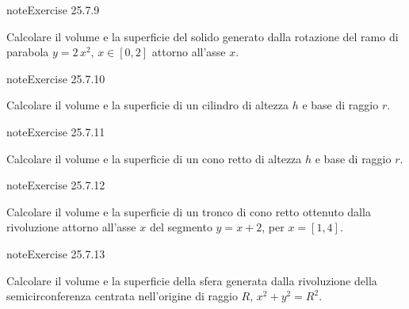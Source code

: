 \documentclass[letterpaper,10pt,italian]{jupyterBook}
\begin{document}
\begin{sphinxadmonition}{note}{Exercise 25.7.9}





\sphinxAtStartPar
Calcolare il volume e la superficie del solido generato dalla rotazione del ramo di parabola \(y = 2\, x^2\), \(x \in [0,2]\) attorno all’asse \(x\).
\end{sphinxadmonition}
 \label{exercise:ch/infinitesimal_calculus/integrals-problems-exercise-9}

\begin{sphinxadmonition}{note}{Exercise 25.7.10}





\sphinxAtStartPar
Calcolare il volume e la superficie di un cilindro di altezza \(h\) e base di raggio \(r\).
\end{sphinxadmonition}
 \label{exercise:ch/infinitesimal_calculus/integrals-problems-exercise-10}

\begin{sphinxadmonition}{note}{Exercise 25.7.11}





\sphinxAtStartPar
Calcolare il volume e la superficie di un cono retto di altezza \(h\) e base di raggio \(r\).
\end{sphinxadmonition}
 \label{exercise:ch/infinitesimal_calculus/integrals-problems-exercise-11}

\begin{sphinxadmonition}{note}{Exercise 25.7.12}





\sphinxAtStartPar
Calcolare il volume e la superficie di un tronco di cono retto ottenuto dalla rivoluzione attorno all’asse \(x\) del segmento \(y = x + 2\), per \(x = [1,4]\).
\end{sphinxadmonition}
 \label{exercise:ch/infinitesimal_calculus/integrals-problems-exercise-12}

\begin{sphinxadmonition}{note}{Exercise 25.7.13}





\sphinxAtStartPar
Calcolare il volume e la superficie della sfera generata dalla rivoluzione della semicirconferenza centrata nell’origine di raggio \(R\), \(x^2 + y^2 = R^2\).
\end{sphinxadmonition}
 \label{exercise:ch/infinitesimal_calculus/integrals-problems-exercise-13}
\end{document}
